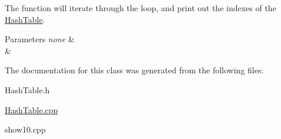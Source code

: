 The function will iterate through the loop, and print out the indexes of the \hyperlink{class_hash_table}{Hash\+Table}.


\begin{DoxyParams}{Parameters}
{\em none} & \\
\hline
{\em } & \\
\hline
\end{DoxyParams}


The documentation for this class was generated from the following files\+:\begin{DoxyCompactItemize}
\item 
Hash\+Table.\+h\item 
\hyperlink{_hash_table_8cpp}{Hash\+Table.\+cpp}\item 
show10.\+cpp\end{DoxyCompactItemize}
